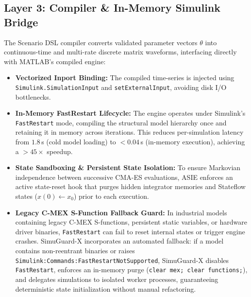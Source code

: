 \documentclass[journal]{IEEEtran}
\begin{document}
\subsection{Layer 3: Compiler \& In-Memory Simulink Bridge}
The Scenario DSL compiler converts validated parameter vectors $\theta$ into continuous-time and multi-rate discrete matrix waveforms, interfacing directly with MATLAB's compiled engine:
\begin{itemize}
    \item \textbf{Vectorized Inport Binding:} The compiled time-series is injected using \texttt{Simulink.SimulationInput} and \texttt{setExternalInput}, avoiding disk I/O bottlenecks.
    \item \textbf{In-Memory FastRestart Lifecycle:} The engine operates under Simulink's \texttt{FastRestart} mode, compiling the structural model hierarchy once and retaining it in memory across iterations. This reduces per-simulation latency from $1.8$\,s (cold model loading) to $<0.04$\,s (in-memory execution), achieving a $>45\times$ speedup.
    \item \textbf{State Sandboxing \& Persistent State Isolation:} To ensure Markovian independence between successive CMA-ES evaluations, ASIE enforces an active state-reset hook that purges hidden integrator memories and Stateflow states ($x(0) \leftarrow x_0$) prior to each execution.
    \item \textbf{Legacy C-MEX S-Function Fallback Guard:} In industrial models containing legacy C-MEX S-functions, persistent static variables, or hardware driver binaries, \texttt{FastRestart} can fail to reset internal states or trigger engine crashes. SimuGuard-X incorporates an automated fallback: if a model contains non-reentrant binaries or raises \texttt{Simulink:Commands:FastRestartNotSupported}, SimuGuard-X disables \texttt{FastRestart}, enforces an in-memory purge (\texttt{clear mex; clear functions;}), and delegates simulations to isolated worker processes, guaranteeing deterministic state initialization without manual refactoring.
\end{itemize}
\end{document}
